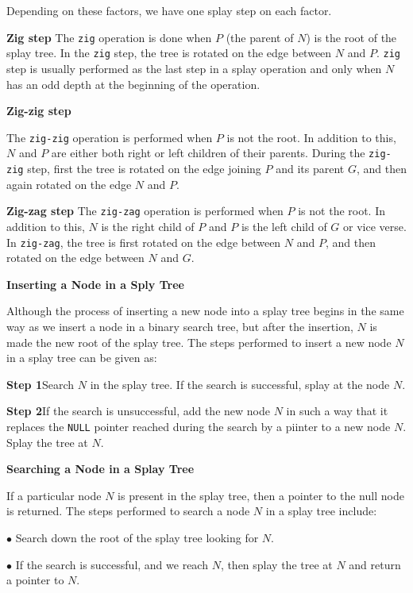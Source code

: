 Depending on these factors, we have one splay step on each factor.

\vskip 2mm
{\bf Zig step}
\vskip 1mm
The {\tt zig} operation is done when $P$ (the parent of $N$) is the root of the splay tree. In the {\tt zig} step, the tree is rotated on the edge between $N$ and $P$. {\tt zig} step is usually performed as the last step in a splay operation and only when $N$ has an odd depth at the beginning of the operation.

\vskip 3mm
{\bf Zig-zig step}

\vskip 1mm
The {\tt zig-zig} operation is performed when $P$ is not the root. In addition to this, $N$ and $P$ are either both right or left children of their parents. During the {\tt zig-zig} step, first the tree is rotated on the edge joining $P$ and its parent $G$, and then again rotated on the edge $N$ and $P$.

\vskip 3mm
{\bf Zig-zag step} The {\tt zig-zag} operation is performed when $P$ is not the root. In addition to this, $N$ is the right child of $P$ and $P$ is the left child of $G$ or vice verse. In {\tt zig-zag}, the tree is first rotated on the edge between $N$ and $P$, and then rotated on the edge between $N$ and $G$.

\vskip 3mm
{\bf Inserting a Node in a Sply Tree}

\vskip 1mm
Although the process of inserting a new node into a splay tree begins in the same way as we insert a node in a binary search tree, but after the insertion, $N$ is made the new root of the splay tree. The steps performed to insert a new node $N$ in a splay tree can be given as:

\vskip 2mm
{\bf Step 1}\qquad Search $N$ in the splay tree. If the search is successful, splay at the node $N$.

\vskip 3mm
{\bf Step 2}\qquad If the search is unsuccessful, add the new node $N$ in such a way that it replaces the {\tt NULL} pointer reached during the search by a piinter to a new node $N$. Splay the tree at $N$.

\vskip 3mm
{\bf Searching a Node in a Splay Tree}

\vskip 1mm
If a particular node $N$ is present in the splay tree, then a pointer to the null node is returned. The steps performed to search a node $N$ in a splay tree include:

\vskip 2mm
\qquad$\bullet$ Search down the root of the splay tree looking for $N$.

\vskip 3mm
\qquad$\bullet$ If the search is successful, and we reach $N$, then splay the tree at $N$ and return a pointer to $N$.

